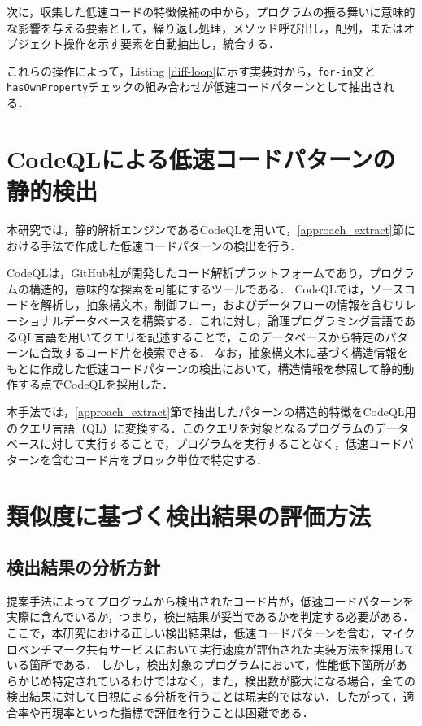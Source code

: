 \documentclass[11pt]{jreport}
\begin{document}
次に，収集した低速コードの特徴候補の中から，プログラムの振る舞いに意味的な影響を与える要素として，繰り返し処理，メソッド呼び出し，配列，またはオブジェクト操作を示す要素を自動抽出し，統合する．

これらの操作によって，Listing \ref{diff-loop}に示す実装対から，\texttt{for-in}文と\texttt{hasOwnProperty}チェックの組み合わせが低速コードパターンとして抽出される．



\section{CodeQLによる低速コードパターンの静的検出}
\label{approach_codeQL}

本研究では，静的解析エンジンであるCodeQLを用いて，\ref{approach_extract}節における手法で作成した低速コードパターンの検出を行う．

CodeQLは，GitHub社が開発したコード解析プラットフォームであり，プログラムの構造的，意味的な探索を可能にするツールである．
CodeQLでは，ソースコードを解析し，抽象構文木，制御フロー，およびデータフローの情報を含むリレーショナルデータベースを構築する．これに対し，論理プログラミング言語であるQL言語を用いてクエリを記述することで，このデータベースから特定のパターンに合致するコード片を検索できる．
なお，抽象構文木に基づく構造情報をもとに作成した低速コードパターンの検出において，構造情報を参照して静的動作する点でCodeQLを採用した．

本手法では，\ref{approach_extract}節で抽出したパターンの構造的特徴をCodeQL用のクエリ言語（QL）に変換する．このクエリを対象となるプログラムのデータベースに対して実行することで，プログラムを実行することなく，低速コードパターンを含むコード片をブロック単位で特定する．


\section{類似度に基づく検出結果の評価方法}
\label{approach_evaluation}

\subsection{検出結果の分析方針}

提案手法によってプログラムから検出されたコード片が，低速コードパターンを実際に含んでいるか，つまり，検出結果が妥当であるかを判定する必要がある．ここで，本研究における正しい検出結果は，低速コードパターンを含む，マイクロベンチマーク共有サービスにおいて実行速度が評価された実装方法を採用している箇所である．
しかし，検出対象のプログラムにおいて，性能低下箇所があらかじめ特定されているわけではなく，また，検出数が膨大になる場合，全ての検出結果に対して目視による分析を行うことは現実的ではない．したがって，適合率や再現率といった指標で評価を行うことは困難である．
\end{document}
